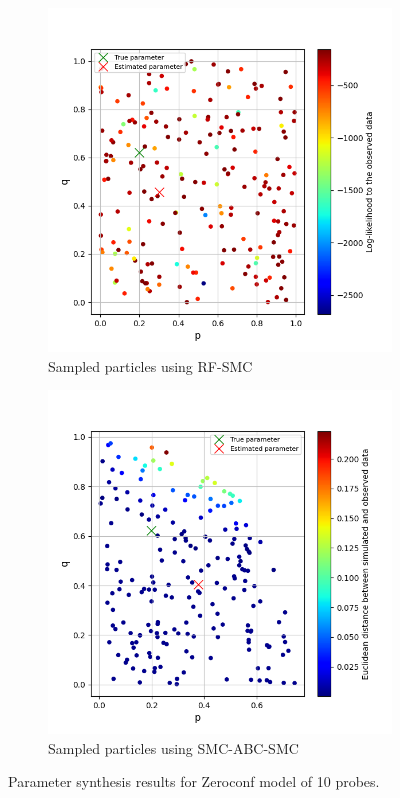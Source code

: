 \begin{figure}[H]
    \centering
    \begin{subfigure}{0.48\textwidth}
        \centering
        \includegraphics[width=\linewidth]{figures/zeroconf10_rf.png}
        \caption{Sampled particles using RF-SMC}
    \end{subfigure}
    \hfill
    \begin{subfigure}{0.48\textwidth}
        \centering
        \includegraphics[width=\linewidth]{figures/zeroconf10_sim.png}
        \caption{Sampled particles using SMC-ABC-SMC}
    \end{subfigure}
    \caption{Parameter synthesis results for Zeroconf model of 10 probes.}
\end{figure}

